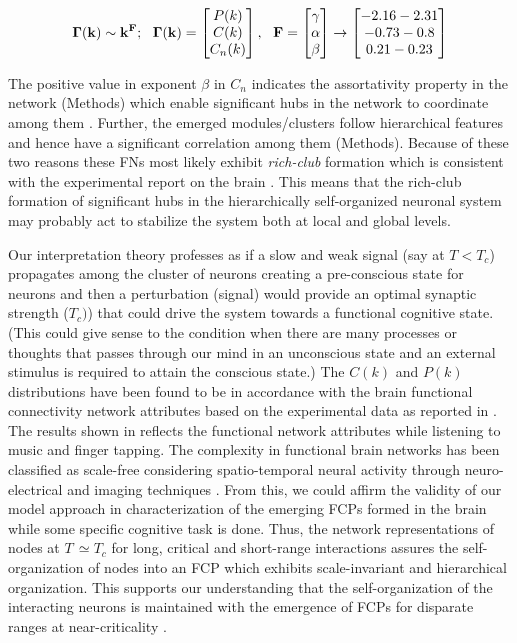 \documentclass[preprintnumbers,amsmath,amssymb,onecolumn]{revtex4}
\begin{document}
\begin{eqnarray}
\bf{\Gamma(k)}\sim k^{F};~~\bf{\Gamma(k)}=\left[\begin{matrix}P(k)\\C(k)\\C_n(k) \end{matrix}\right],~~F=\left[\begin{matrix}\gamma\\ \alpha\\ \beta\end{matrix} \right]\rightarrow\left[\begin{matrix}-2.16-2.31\\-0.73-0.8\\0.21-0.23 \end{matrix}\right]
\end{eqnarray}

The positive value in exponent $\beta$ in $C_n$ indicates the assortativity property in the network (Methods) which enable significant hubs in the network to coordinate among them \citep{Colizza2006}. Further, the emerged modules/clusters follow hierarchical features and hence have a significant correlation among them (Methods). Because of these two reasons these FNs most likely exhibit \textit{rich-club} formation which is consistent with the experimental report on the brain \citep{teller2014}. This means that the rich-club formation of significant hubs in the hierarchically self-organized neuronal system may probably act to stabilize the system both at local and global levels.

{\noindent}Our interpretation theory professes as if a slow and weak signal (say at $T < T_{c}$) propagates among the cluster of neurons creating a pre-conscious state for neurons and then a perturbation (signal) would provide an optimal synaptic strength ($T_{c})$) that could drive the system towards a functional cognitive state. (This could give sense to the condition when there are many processes or thoughts that passes through our mind in an unconscious state and an external stimulus is required to attain the conscious state.) The $C(k)$ and $P(k)$ distributions have been found to be in accordance with the brain functional connectivity network attributes based on the experimental data as reported in \citep{Eguiluz2005a,Sporns2004}. The results shown in \citep{Eguiluz2005a} reflects the functional network attributes while listening to music and finger tapping. The complexity in functional brain networks has been classified as scale-free considering spatio-temporal neural activity through neuro-electrical and imaging techniques \citep{Beggs2003}. From this, we could affirm the validity of our model approach in characterization of the emerging FCPs formed in the brain while some specific cognitive task is done\citep{ThomasYeo2015}. Thus, the network representations of nodes at $T\,\simeq$$T_{c}$ for long, critical and short-range interactions assures the self-organization of nodes into an FCP which exhibits scale-invariant and hierarchical organization. This supports our understanding that the self-organization of the interacting neurons is maintained with the emergence of FCPs for disparate ranges at near-criticality \citep{Deco2012}. \\
\end{document}
